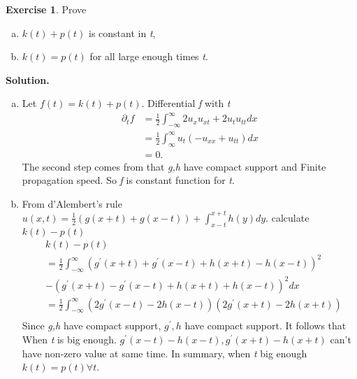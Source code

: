 \documentclass[a4paper]{book}
\newenvironment{solution}%
{\noindent\textbf{Solution.}}%
{\qedhere}
\numberwithin{equation}{chapter}
\theoremstyle{definition}
\newtheorem{exc}[exm]{Exercise}
\begin{document}
\begin{multicols}{2}
\begin{exc}
  Prove
  \begin{enumerate} [(a)]
  \item $k(t) + p(t)$ is constant in \textit{t},
  \item $k(t) = p(t)$ for all large enough times \textit{t}.
  \end{enumerate}
\end{exc}

\begin{solution}
  \begin{enumerate} [(a)]
  \item Let $f(t) = k(t) + p(t)$. Differential \textit{f} with \textit{t}
    \begin{align*}
      \partial_t f &= \frac{1}{2}{\int^{\infty}_{-\infty} 2u_x u_{xt} + 2u_t u_{tt} dx} \\
                   &= \frac{1}{2} \int^{\infty}_{\infty} u_t(- u_{xx} + u_{tt})dx \\
                   &= 0.
    \end{align*}
    The second step comes from that \textit{g,h} have compact support and Finite propagation speed. So \textit{f} is constant function for \textit{t}.

  \item From d'Alembert's rule $u(x,t) = \frac{1}{2}(g(x+t) + g(x-t)) + \int_{x-t}^{x+t} h(y)dy$.
    calculate $k(t) - p(t)$
    \begin{align*}
      &k(t) - p(t) \\
      &=\frac{1}{2}\int_{-\infty}^{\infty} {(g^\prime(x+t) + g^\prime(x-t) + h(x+t) - h(x-t))}^2 \\
      &- {(g^\prime(x+t) - g^\prime(x-t) + h(x+t) + h(x-t))}^2 dx \\
      &=\frac{1}{2}\int_{-\infty}^{\infty} (2 g^\prime(x-t) - 2 h(x-t)) (2 g^\prime(x+t) - 2 h(x+t)) \\
    \end{align*}
    Since \textit{g,h} have compact support, $g^\prime, h$ have compact support. It follows that When \textit{t} is big enough. $g^\prime(x-t) - h(x-t), g^\prime(x+t) - h(x+t)$ can't have non-zero value at same time. In summary, when \textit{t} big enough $k(t) = p(t) \forall t$.
  \end{enumerate}
\end{solution}




\end{multicols}
\end{document}
